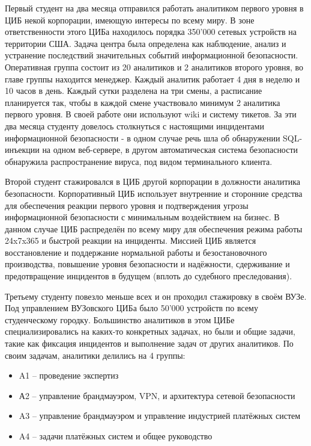 \documentclass[10pt,a4paper]{article}
\begin{document}
\begin{multicols}{2}
Первый студент на два месяца отправился работать аналитиком первого уровня в ЦИБ некой корпорации, имеющую интересы по всему миру. В зоне ответственности этого ЦИБа находилось порядка 350'000 сетевых устройств на территории США. Задача центра была определена как наблюдение, анализ и устранение последствий значительных событий информационной безопасности. Оперативная группа состоит из 20 аналитиков и 2 аналитиков второго уровня, во главе группы находится менеджер. Каждый аналитик работает 4 дня в неделю и 10 часов в день. Каждый сутки разделена на три смены, а расписание планируется так, чтобы в каждой смене участвовало минимум 2 аналитика первого уровня. В своей работе они используют wiki и систему тикетов. За эти два месяца студенту довелось столкнуться с настоящими инцидентами информационной безопасности - в одном случае речь шла об обнаружении SQL-инъекции на одном веб-сервере, в другом автоматическая система безопасности обнаружила распространение вируса, под видом терминального клиента.

Второй студент стажировался в ЦИБ другой корпорации в должности аналитика безопасности. Корпоративный ЦИБ использует внутренние и сторонние средства для обеспечения реакции первого уровня и подтверждения угрозы информационной безопасности с минимальным воздействием на бизнес. В данном случае ЦИБ распределён по всему миру для обеспечения режима работы 24x7x365 и быстрой реакции на инциденты. Миссией ЦИБ является восстановление и поддержание нормальной работы и безостановочного производства, повышение уровня безопасности и надёжности, сдерживание и предотвращение инцидентов в будущем (вплоть до судебного преследования). 

Третьему студенту повезло меньше всех и он проходил стажировку в своём ВУЗе. Под управлением ВУЗовского ЦИБа было 50'000 устройств по всему студенческому городку. Большинство аналитиков в этом ЦИБе специализировались на каких-то конкретных задачах, но были и общие задачи, такие как фиксация инцидентов и выполнение задач от других аналитиков. По своим задачам, аналитики делились на 4 группы:
\begin{itemize}
\item A1 -- проведение экспертиз
\item А2 -- управление брандмауэром, VPN, и архитектура сетевой безопасности
\item A3 -- управление брандмауэром и управление индустрией платёжных систем
\item A4 -- задачи платёжных систем и общее руководство
\end{itemize}


\end{multicols}
\end{document}
